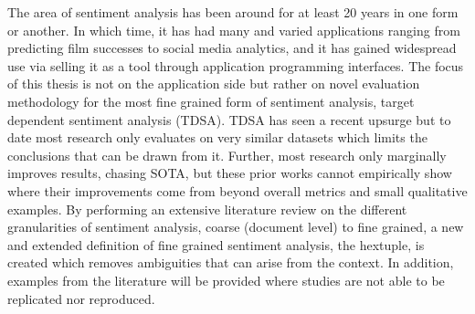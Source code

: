 

The area of sentiment analysis has been around for at least 20 years in one form or another. In which time, it has had many and varied applications ranging from predicting film successes to social media analytics, and it has gained widespread use via selling it as a tool through application programming interfaces. The focus of this thesis is not on the application side but rather on novel evaluation methodology for the most fine grained form of sentiment analysis, target dependent sentiment analysis (TDSA). TDSA has seen a recent upsurge but to date most research only evaluates on very similar datasets which limits the conclusions that can be drawn from it. Further, most research only marginally improves results, chasing SOTA, but these prior works cannot empirically show where their improvements come from beyond overall metrics and small qualitative examples. By performing an extensive literature review on the different granularities of sentiment analysis, coarse (document level) to fine grained, a new and extended definition of fine grained sentiment analysis, the hextuple, is created which removes ambiguities that can arise from the context. In addition, examples from the literature will be provided where studies are not able to be replicated nor reproduced.

